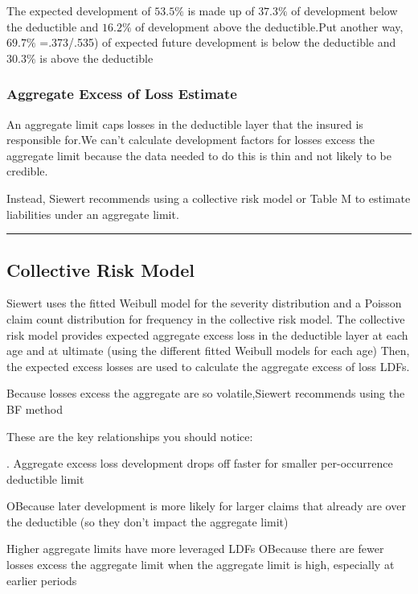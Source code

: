 \documentclass[
]{article}
\begin{document}
The expected development of \(53.5\%\) is made up of \(37.3\%\) of
development below the deductible and \(16.2\%\) of development above the
deductible.Put another way, \(69.7\%\) =.373/.535) of expected future
development is below the deductible and \(30.3\%\) is above the
deductible

\subsubsection{Aggregate Excess of Loss
Estimate}\label{aggregate-excess-of-loss-estimate}

An aggregate limit caps losses in the deductible layer that the insured
is responsible for.We can't calculate development factors for losses
excess the aggregate limit because the data needed to do this is thin
and not likely to be credible.

Instead, Siewert recommends using a collective risk model or Table M to
estimate liabilities under an aggregate limit.

\begin{center}\rule{0.5\linewidth}{0.5pt}\end{center}

\subsection{Collective Risk Model}\label{collective-risk-model}

Siewert uses the fitted Weibull model for the severity distribution and
a Poisson claim count distribution for frequency in the collective risk
model. The collective risk model provides expected aggregate excess loss
in the deductible layer at each age and at ultimate (using the different
fitted Weibull models for each age) Then, the expected excess losses are
used to calculate the aggregate excess of loss LDFs.

Because losses excess the aggregate are so volatile,Siewert recommends
using the BF method

These are the key relationships you should notice:

. Aggregate excess loss development drops off faster for smaller
per-occurrence deductible limit

OBecause later development is more likely for larger claims that already
are over the deductible (so they don't impact the aggregate limit)

Higher aggregate limits have more leveraged LDFs OBecause there are
fewer losses excess the aggregate limit when the aggregate limit is
high, especially at earlier periods
\end{document}
